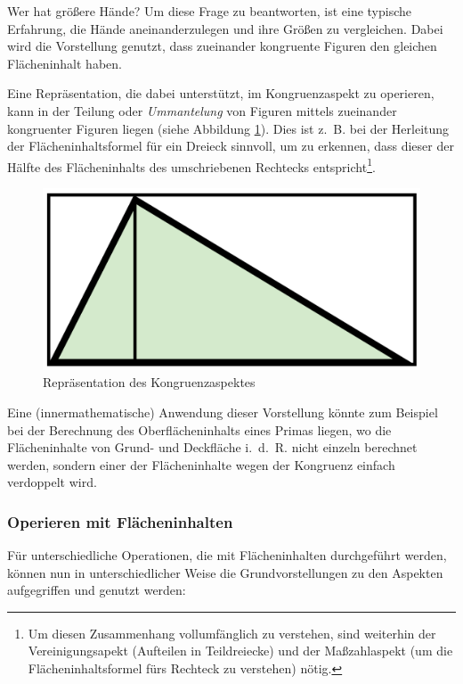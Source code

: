 \documentclass[
  ngerman,
]{scrbook}
\theoremstyle{definition}
\theoremstyle{definition}
\theoremstyle{definition}
\theoremstyle{definition}
\theoremstyle{remark}
\begin{document}
Wer hat größere Hände? Um diese Frage zu beantworten, ist eine typische Erfahrung, die Hände aneinanderzulegen und ihre Größen zu vergleichen. Dabei wird die Vorstellung genutzt, dass zueinander kongruente Figuren den gleichen Flächeninhalt haben.

Eine Repräsentation, die dabei unterstützt, im Kongruenzaspekt zu operieren, kann in der Teilung oder \emph{Ummantelung} von Figuren mittels zueinander kongruenter Figuren liegen (siehe Abbildung \ref{fig:FlaecheKongruenz}). Dies ist z.~B. bei der Herleitung der Flächeninhaltsformel für ein Dreieck sinnvoll, um zu erkennen, dass dieser der Hälfte des Flächeninhalts des umschriebenen Rechtecks entspricht\footnote{Um diesen Zusammenhang vollumfänglich zu verstehen, sind weiterhin der Vereinigungsapekt (Aufteilen in Teildreiecke) und der Maßzahlaspekt (um die Flächeninhaltsformel fürs Rechteck zu verstehen) nötig.}.

\begin{figure}

{\centering \includegraphics[width=0.25\linewidth]{pictures/5-Kongruenz} 

}

\caption{Repräsentation des Kongruenzaspektes}\label{fig:FlaecheKongruenz}
\end{figure}

Eine (innermathematische) Anwendung dieser Vorstellung könnte zum Beispiel bei der Berechnung des Oberflächeninhalts eines Primas liegen, wo die Flächeninhalte von Grund- und Deckfläche i.~d.~R. nicht einzeln berechnet werden, sondern einer der Flächeninhalte wegen der Kongruenz einfach verdoppelt wird.

\hypertarget{operieren-mit-fluxe4cheninhalten}{%
\subsubsection{Operieren mit Flächeninhalten}\label{operieren-mit-fluxe4cheninhalten}}

Für unterschiedliche Operationen, die mit Flächeninhalten durchgeführt werden, können nun in unterschiedlicher Weise die Grundvorstellungen zu den Aspekten aufgegriffen und genutzt werden:
\end{document}
